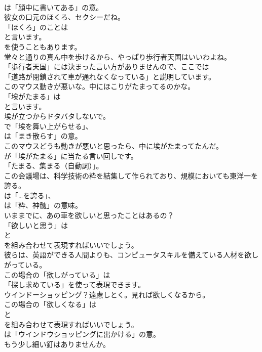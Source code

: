 \documentclass[8pt]{extreport}
\begin{document}
\begin{CJK}{UTF8}{min}
\\	は「顔中に書いてある」の意。	
\\	彼女の口元のほくろ、セクシーだね。 
\\	「ほくろ」のことは
\\	と言います。
\\	を使うこともあります。	
\\	堂々と通りの真ん中を歩けるから、やっぱり歩行者天国はいいわよね。 
\\	「歩行者天国」には決まった言い方がありませんので、ここでは
\\	「道路が閉鎖されて車が通れなくなっている」と説明しています。	
\\	このマウス動きが悪いな。中にほこりがたまってるのかな。 
\\	「埃がたまる」は
\\	と言います。	
\\	埃が立つからドタバタしないで。 
\\	で「埃を舞い上がらせる」、
\\	は「まき散らす」の意。	
\\	このマウスどうも動きが悪いと思ったら、中に埃がたまってたんだ。 
\\	が「埃がたまる」に当たる言い回しです。
\\	「たまる、集まる（自動詞）」。	
\\	この会議場は、科学技術の粋を結集して作られており、規模においても東洋一を誇る。 
\\	は「…を誇る」、
\\	は「粋、神髄」の意味。	
\\	いままでに、あの車を欲しいと思ったことはあるの？ 
\\	「欲しいと思う」は
\\	と
\\	を組み合わせて表現すればいいでしょう。	
\\	彼らは、英語ができる人間よりも、コンピュータスキルを備えている人材を欲しがっている。 
\\	この場合の「欲しがっている」は
\\	「探し求めている」を使って表現できます。	
\\	ウインドーショッピング？遠慮しとく。見れば欲しくなるから。 
\\	この場合の「欲しくなる」は 
\\	と 
\\	を組み合わせて表現すればいいでしょう。
\\	は「ウインドウショッピングに出かける」の意。	
\\	もう少し細い釘はありませんか。 

\end{CJK}
\end{document}
